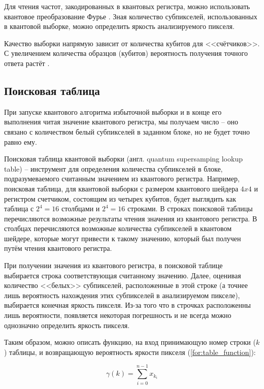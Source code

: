 Для чтения частот, закодированных в квантовых регистра, можно использовать квантовое преобразование Фурье \cite{PQC-fourier}. Зная количество субпикселей, использованных в квантовой выборке, можно определить яркость анализируемого пикселя.

Качество выборки напрямую зависит от количества кубитов для <<счётчиков>>. С увеличением количества образцов (кубитов) вероятность получения точного ответа растёт \cite{PQC-qbits}.

\subsection{Поисковая таблица}

При запуске квантового алгоритма избыточной выборки и в конце его выполнения читая значение квантового регистра, мы получаем число -- оно связано с количеством белый субпикселей в заданном блоке, но не будет точно равно ему. 

Поисковая таблица квантовой выборки (англ. quantum supersamping lookup table) -- инструмент для определения количества субпикселей в блоке, подразумеваемого считанным значением из квантового регистра. Например, поисковая таблица, для квантовой выборки с размером квантового шейдера $4x4$ и регистром счетчиком, состоящим из четырех кубитов, будет выглядить как таблица с $2^4 = 16$ столбцами и $2^4 = 16$ строками. В строках поисковой таблицы перечисляются возможные результаты чтения значения из квантового регистра. В столбцах перечисляются возможные количества  субпикселей в квантовом шейдере, которые могут привести к такому значению, который был получен путём чтения квантового регистра.

При получении значения из квантового регистра, в поисковой таблице выбирается строка соответствующая считанному значению. Далее, оценивая количество <<белых>> субпикселей, расположенные в этой строке (а точнее лишь вероятность нахождения этих субпикселей в анализируемом пикселе), выбирается конечная яркость пикселя. Из-за того что в строчках расположенны лишь вероятности, появляется некоторая погрешность и не всегда можно  однозначно определить яркость пикселя.

Таким образом, можно описать функцию, на вход принимающую номер строки ($k$) таблицы, и возвращающую вероятность яркости пикселя (\ref{for:table_function}):

\begin{equation}
	\label{for:table_function}
	\gamma(k) = \sum_{i=0}^{n - 1} x_{k_i}
\end{equation}


